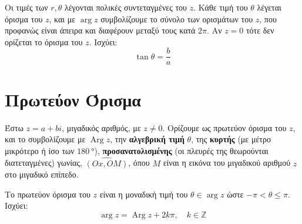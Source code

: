 \documentclass[a4paper,table]{report}
\DeclareMathOperator{\Arg}{Arg}
\begin{document}
Οι τιμές των $r, \theta$ λέγονται \textcolor{Col1}{πολικές συντεταγμένες} του $z$. Κάθε
τιμή του $\theta$ λέγεται \textcolor{Col1}{όρισμα} του $z$, και με $\arg z$ 
συμβολίζουμε το σύνολο των ορισμάτων του $z$, που προφανώς είναι άπειρα και διαφέρουν 
μεταξύ τους κατά $2\pi$. Αν $z=0$ τότε δεν ορίζεται το όρισμα του $z$. Ισχύει:
\[
  \tan\theta=\frac{b}{a}
\]


\section*{Πρωτεύον Όρισμα}


\begin{mybox1}
  \begin{dfn}
    Έστω $ z=a+bi $, μιγαδικός αριθμός, με $ z \neq 0 $. 
    Ορίζουμε ως \textcolor{Col1}{πρωτεύον όρισμα} του $ z 
    $, και το συμβολίζουμε με $ \Arg z $, την \textbf{αλγεβρική τιμή} $\theta$, 
    της \textbf{κυρτής} (με μέτρο μικρότερο ή ίσο των $ \SI{180}{\degree} $), 
    \textbf{προσανατολισμένης} (οι πλευρές της θεωρούνται διατεταγμένες) γωνίας, 
    $ \widehat{(Ox,OM)} $, όπου $M$ είναι η εικόνα του 
    μιγαδικού αριθμού $z$ στο μιγαδικό επίπεδο.
  \end{dfn}
\end{mybox1}
\begin{rem}
  Το πρωτεύον όρισμα του $z$ είναι η μοναδική τιμή του 
  $\theta\in \arg z$ ώστε $ - \pi < \theta \leq \pi$. 
  Ισχύει:
  \[
    \arg z=\Arg z+2k\pi, \quad k\in\mathbb{Z}
  \]
\end{rem}
\end{document}
